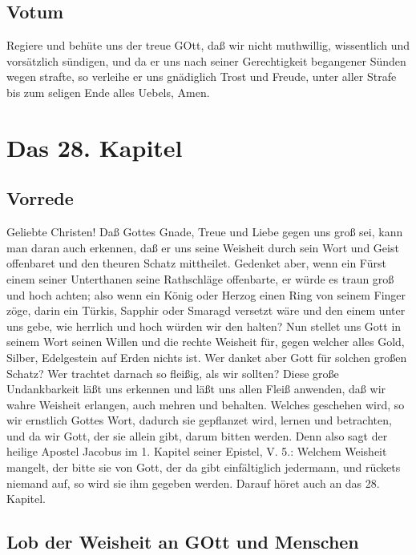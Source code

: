 \section{Votum}

Regiere und behüte uns der treue GOtt, daß wir nicht muthwillig, wissentlich und vorsätzlich sündigen, und da er uns nach seiner Gerechtigkeit begangener Sünden wegen strafte, so verleihe er uns gnädiglich Trost und Freude, unter aller Strafe bis zum seligen Ende alles Uebels, Amen.

\chapter{Das 28. Kapitel}

\section{Vorrede}

Geliebte Christen! Daß Gottes Gnade, Treue und Liebe gegen uns groß sei, kann man daran auch erkennen, daß er uns seine Weisheit durch sein Wort und Geist offenbaret und den theuren Schatz mittheilet. Gedenket aber, wenn ein Fürst einem seiner Unterthanen seine Rathschläge offenbarte, er würde es traun groß und hoch achten; also wenn ein König oder Herzog einen Ring von seinem Finger zöge, darin ein Türkis, Sapphir oder Smaragd versetzt wäre und den einem unter uns gebe, wie herrlich und hoch würden wir den halten? Nun stellet uns Gott in seinem Wort seinen Willen und die rechte Weisheit für, gegen welcher alles Gold, Silber, Edelgestein auf Erden nichts ist. Wer danket aber Gott für solchen großen Schatz? Wer trachtet darnach so fleißig, als wir sollten? Diese große Undankbarkeit läßt uns erkennen und läßt uns allen Fleiß anwenden, daß wir wahre Weisheit erlangen, auch mehren und behalten. Welches geschehen wird, so wir ernstlich Gottes Wort, dadurch sie gepflanzet wird, lernen und betrachten, und da wir Gott, der sie allein gibt, darum bitten werden. Denn also sagt der heilige Apostel Jacobus im 1. Kapitel seiner Epistel, V. 5.: Welchem Weisheit mangelt, der bitte sie von Gott, der da gibt einfältiglich jedermann, und rückets niemand auf, so wird sie ihm gegeben werden. Darauf höret auch an das 28. Kapitel.

\section{Lob der Weisheit an GOtt und Menschen}

